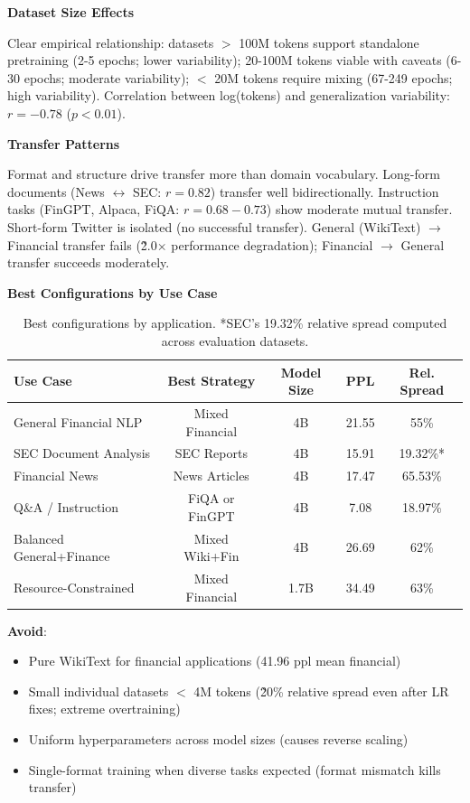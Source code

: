 \textbf{Dataset Size Effects}

Clear empirical relationship: datasets $>$ 100M tokens support standalone pretraining (2-5 epochs; lower variability); 20-100M tokens viable with caveats (6-30 epochs; moderate variability); $<$ 20M tokens require mixing (67-249 epochs; high variability). Correlation between log(tokens) and generalization variability: $r = -0.78$ ($p < 0.01$).

\textbf{Transfer Patterns}

Format and structure drive transfer more than domain vocabulary. Long-form documents (News $\leftrightarrow$ SEC: $r = 0.82$) transfer well bidirectionally. Instruction tasks (FinGPT, Alpaca, FiQA: $r = 0.68-0.73$) show moderate mutual transfer. Short-form Twitter is isolated (no successful transfer). General (WikiText) $\to$ Financial transfer fails (\~2.0$\times$ performance degradation); Financial $\to$ General transfer succeeds moderately.

\textbf{Best Configurations by Use Case}

\begin{table}[h]
\centering
\small
\begin{tabular}{lcccc}
\toprule
\textbf{Use Case} & \textbf{Best Strategy} & \textbf{Model Size} & \textbf{PPL} & \textbf{Rel. Spread} \\
\midrule
General Financial NLP & Mixed Financial & 4B & 21.55 & 55\% \\
SEC Document Analysis & SEC Reports & 4B & 15.91 & 19.32\%* \\
Financial News & News Articles & 4B & 17.47 & 65.53\% \\
Q\&A / Instruction & FiQA or FinGPT & 4B & 7.08 & 18.97\% \\
Balanced General+Finance & Mixed Wiki+Fin & 4B & 26.69 & 62\% \\
Resource-Constrained & Mixed Financial & 1.7B & 34.49 & 63\% \\
\bottomrule
\end{tabular}
\caption[Best Configurations by Application]{Best configurations by application. *SEC's 19.32\% relative spread computed across evaluation datasets.}
\end{table}

\textbf{Avoid}:
\begin{itemize}
\item Pure WikiText for financial applications (41.96 ppl mean financial)
\item Small individual datasets $<$ 4M tokens (\~20\% relative spread even after LR fixes; extreme overtraining)
\item Uniform hyperparameters across model sizes (causes reverse scaling)
\item Single-format training when diverse tasks expected (format mismatch kills transfer)
\end{itemize}

